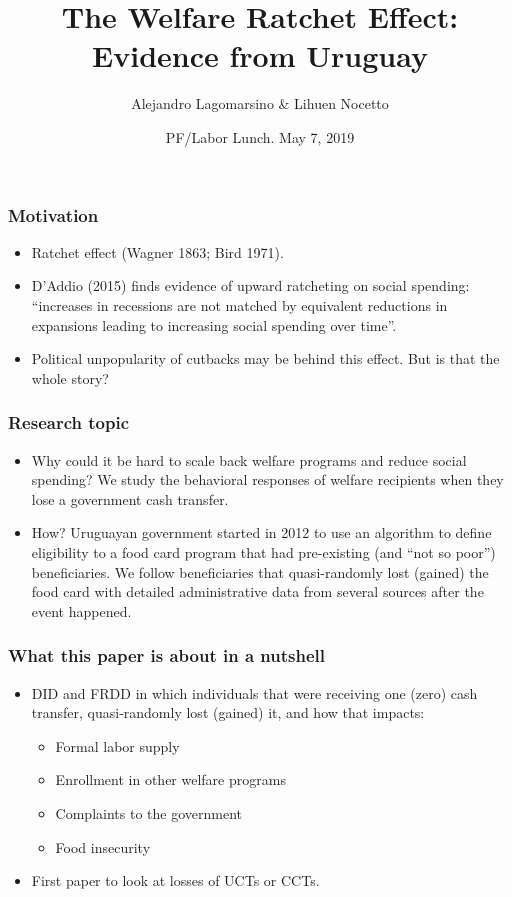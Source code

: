 \documentclass{beamer}
\title[The Welfare Ratchet Effect] %
{The Welfare Ratchet Effect: Evidence from Uruguay}
\author[Alejandro Lagomarsino] %
{Alejandro Lagomarsino \& Lihuen Nocetto\inst{*} }
\institute[] %
{
	\inst{*}%
	Harvard University\\
	Pontifical Catholic University of Chile
}
\date[PF/Labor Lunch - May 2019] %
{PF/Labor Lunch. May 7, 2019}
\begin{document}
	\setlength{\parindent}{10pt}
	
	\frame{\titlepage}

\begin{frame}
\frametitle{Motivation}
\begin{itemize}
	\item Ratchet effect (Wagner 1863; Bird 1971).
	\item D'Addio (2015) finds evidence of upward ratcheting on social spending: ``increases in recessions are not matched by equivalent reductions in expansions leading to increasing social spending over time''.
	\item Political unpopularity of cutbacks may be behind this effect. But is that the whole story?
\end{itemize}
\end{frame}

\begin{frame}
\frametitle{Research topic}
\begin{itemize}
	\item Why could it be hard to scale back welfare programs and reduce social spending? We study the behavioral responses of welfare recipients when they lose a government cash transfer.
	\item How? Uruguayan government started in 2012 to use an algorithm to define eligibility to a food card program that had pre-existing (and ``not so poor'') beneficiaries. We follow beneficiaries that quasi-randomly lost (gained) the food card with detailed administrative data from several sources after the event happened.
\end{itemize}
\end{frame}

\begin{frame}
\frametitle{What this paper is about in a nutshell}
\begin{itemize}
\item DID and FRDD in which individuals that were receiving one (zero) cash transfer, quasi-randomly lost (gained) it, and how that impacts:
\begin{itemize}
	\item Formal labor supply
	\item Enrollment in other welfare programs
	\item Complaints to the government
	\item Food insecurity
\end{itemize}
\item First paper to look at losses of UCTs or CCTs.
\end{itemize}
\end{frame}
\end{document}
